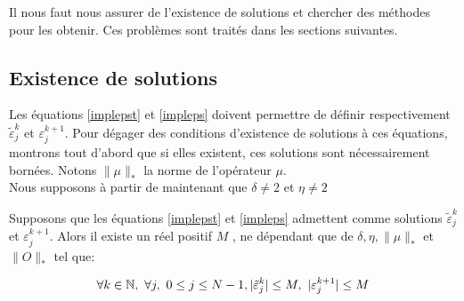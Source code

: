 \begin{itemize}
\begin{enumerate}
	\end{enumerate}
	
\end{itemize}
Il nous faut nous assurer de l'existence de solutions et chercher des méthodes pour les obtenir. Ces problèmes sont traités dans les sections suivantes.

\subsection{Existence de solutions}
Les équations \eqref{implepst} et \eqref{impleps} doivent permettre de définir respectivement $ \tilde{\varepsilon}_j^k $ et $ \varepsilon_j^{k+1} $. Pour dégager des conditions d'existence de solutions à ces équations, montrons tout d'abord que si elles existent, ces solutions sont nécessairement bornées. Notons $ \lVert \mu \rVert_* $ la norme de l'opérateur $\mu$.\\

Nous supposons à partir de maintenant que $\delta \neq 2$ et $\eta \neq 2$

\begin{theorem} \label{theoborne}
	Supposons que les équations \eqref{implepst} et \eqref{impleps} admettent comme solutions $ \tilde{\varepsilon}_j^k $ et $ \varepsilon_j^{k+1} $. Alors il existe un réel positif $M$ , ne dépendant que de $\delta,\eta,\lVert \mu \rVert_*$ et $\lVert O \rVert_*$ tel que:
	
	$$ \forall k \in \mathbb N,\  \forall j,\  0 \leq j \leq N-1, |\tilde{\varepsilon}_j^k|\leq M,\ |\varepsilon_j^{k+1}| \leq M$$
	
\end{theorem}

